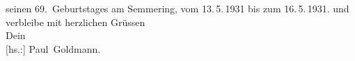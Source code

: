 \begin{ledgroupsized}[t]{13cm}
{{{                   seinen 69. Geburtstages am Semmering, 
                  vom 13. 5. 1931 bis zum 
                  16. 5. 1931.}}}\label{K_L03517-2h}
               und verbleibe mit herzlichen Grüssen {\\}Dein {\\}{[}hs.:{]} \spacefill\mbox{Paul Goldmann.}\pend
           
         
         \endnumbering{}\end{ledgroupsized}  \newcommand{\dateiname}{L03517}\newcommand{\titel}{Paul Goldmann an Arthur Schnitzler, 19. 5. 1931}\newcommand{\editorInnen}{Martin Anton Müller und Laura Untner}
      